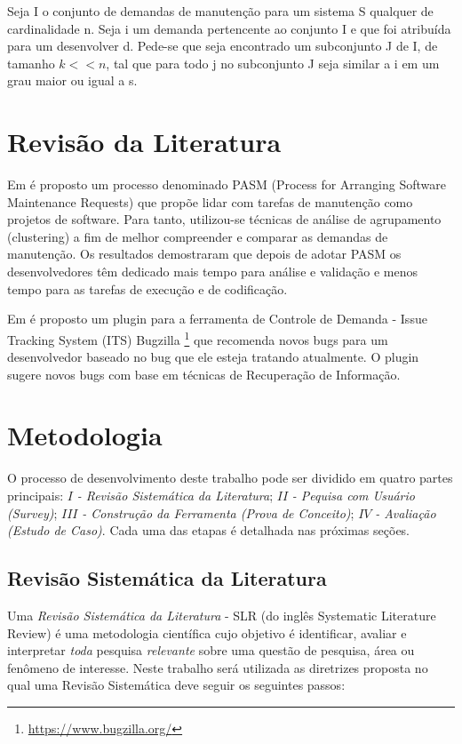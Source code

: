 \documentclass[msc,proposal,hidelot,hideabstract]{ppgccufmg} %
\begin{document}
Seja I o conjunto de demandas de manutenção para um sistema S qualquer de
cardinalidade n. Seja i
um demanda pertencente ao conjunto I e que foi atribuída para um desenvolver
d. Pede-se que seja encontrado um subconjunto J de I, de tamanho $k << n$, tal
que para todo j no subconjunto J seja similar a i em um grau maior ou igual a s.


\chapter{Revisão da Literatura}
\label{ch:revisao}

Em \cite{5741246} é proposto um processo denominado PASM (Process for Arranging
Software Maintenance Requests) que propõe lidar com tarefas de manutenção como
projetos de software. Para tanto, utilizou-se técnicas de análise de
agrupamento (clustering) a fim de melhor compreender e comparar as demandas de
manutenção. Os resultados demostraram que depois de adotar PASM os
desenvolvedores têm dedicado mais tempo para análise e validação e menos tempo
para as tarefas de execução e de codificação.

Em \cite{101186} é proposto um plugin para a ferramenta de Controle de Demanda -
Issue Tracking System (ITS) Bugzilla \footnote{\url{https://www.bugzilla.org/}}
que recomenda novos bugs para um desenvolvedor baseado no bug que ele esteja
tratando atualmente. O plugin sugere novos bugs com base em técnicas de
Recuperação de Informação\cite{baeza1999modern}.


\chapter{Metodologia}
\label{ch:metodologia}

O processo de desenvolvimento deste trabalho pode ser dividido em quatro partes
principais: $I$\textit{ - Revisão Sistemática da Literatura}; $II$\textit{ -
  Pequisa com Usuário (Survey)}; $III$\textit{ - Construção da Ferramenta
  (Prova de Conceito)}; $IV$\textit{ - Avaliação (Estudo de Caso)}. Cada uma das etapas é detalhada nas próximas seções.

\section{Revisão Sistemática da Literatura}
\label{sec:revisao_sistematica}

Uma \textit{Revisão Sistemática da Literatura} - SLR (do inglês Systematic Literature Review) é uma
metodologia científica cujo objetivo é identificar, avaliar e interpretar
\textit{toda} pesquisa \textit{relevante} sobre uma questão de pesquisa, área
ou fenômeno de
interesse\cite{keele2007guidelines,wohlin2012experimentation}. Neste trabalho
será utilizada as diretrizes proposta \cite{keele2007guidelines} no qual uma
Revisão Sistemática deve seguir os seguintes passos:
\end{document}
